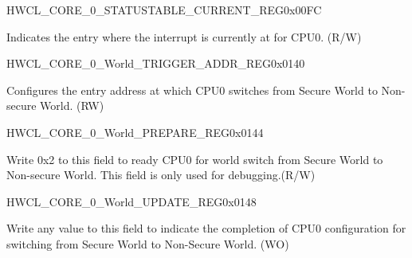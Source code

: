 \begin{register}{H}{WCL\_CORE\_0\_STATUSTABLE\_CURRENT\_REG}{0x00FC}\label{regdesc:WCLCORE0STATUSTABLECURRENTREG}
%
%
%
\regnewline%
\begin{regdesc}\begin{reglist}
\label{fielddesc:WCLCORE0STATUSTABLECURRENT}\item [WCL\_CORE\_0\_STATUSTABLE\_CURRENT] Indicates the entry where the interrupt is currently at for CPU0.  (R/W)
\end{reglist}\end{regdesc}
\end{register}




\begin{register}{H}{WCL\_CORE\_0\_World\_TRIGGER\_ADDR\_REG}{0x0140}\label{regdesc:WCLCORE0WORLDTRIGGERADDRREG}
%
\regnewline%
\begin{regdesc}\begin{reglist}
\label{fielddesc:WCLCORE0WORLDTRIGGERADDR}\item [WCL\_CORE\_0\_WORLD\_TRIGGER\_ADDR] Configures the entry address at which CPU0 switches from Secure World to Non-secure World. (RW)
\end{reglist}\end{regdesc}
\end{register}


\begin{register}{H}{WCL\_CORE\_0\_World\_PREPARE\_REG}{0x0144}\label{regdesc:WCLCORE0WORLDPREPAREREG}
%
%
\regnewline%
\begin{regdesc}\begin{reglist}
\label{fielddesc:WCLCORE0WORLDPREPARE}\item [WCL\_CORE\_0\_WORLD\_PREPARE] Write 0x2 to this field to ready CPU0 for world switch from Secure World to Non-secure World. This field is only used for debugging.(R/W)
\end{reglist}\end{regdesc}
\end{register}

\begin{register}{H}{WCL\_CORE\_0\_World\_UPDATE\_REG}{0x0148}\label{regdesc:WCLCORE0WORLDUPDATEREG}
%
\regnewline%
\begin{regdesc}\begin{reglist}
\label{fielddesc:WCLCORE0UPDATE}\item [WCL\_CORE\_0\_UPDATE] Write any value to this field to indicate the completion of CPU0 configuration for switching from Secure World to Non-Secure World. (WO)
\end{reglist}\end{regdesc}
\end{register}


